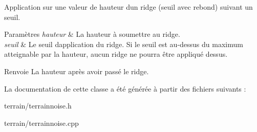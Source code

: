 Application sur une valeur de hauteur d\textquotesingle{}un ridge (seuil avec rebond) suivant un seuil. 


\begin{DoxyParams}{Paramètres}
{\em hauteur} & La hauteur à soumettre au ridge. \\
\hline
{\em seuil} & Le seuil d\textquotesingle{}application du ridge. Si le seuil est au-\/dessus du maximum atteignable par la hauteur, aucun ridge ne pourra être appliqué dessus. \\
\hline
\end{DoxyParams}
\begin{DoxyReturn}{Renvoie}
La hauteur après avoir passé le ridge. 
\end{DoxyReturn}


La documentation de cette classe a été générée à partir des fichiers suivants \+:\begin{DoxyCompactItemize}
\item 
terrain/terrainnoise.\+h\item 
terrain/terrainnoise.\+cpp\end{DoxyCompactItemize}
